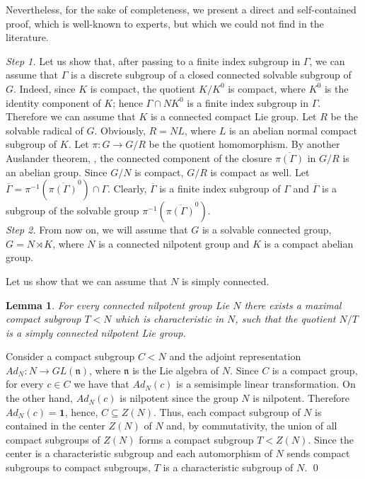 \documentclass[12pt]{article}
\theoremstyle{boldplain}
\newtheorem{lem}[equation]{Lemma}
\theoremstyle{bolddefinition}
\numberwithin{equation}{section}
\def\Ga{\Gamma}
\begin{document}
Nevertheless, for the sake of completeness, we present a direct and 
self-contained proof, which is well-known to  experts, but which we could not find in the literature. 

\medskip 
{\textit{Step 1.}} Let us show that, after passing to a finite index subgroup in $\Gamma$, 
we can assume that $\Gamma$ is a discrete subgroup of a closed connected solvable subgroup of $G$. 
Indeed, since $K$ is compact, the quotient $K/K^0$ is compact, where $K^0$ is the identity component of $K$;  hence $\Gamma \cap N K^0$ is a finite index subgroup in $\Gamma$. 
Therefore we can assume that $K$ is a connected compact Lie group. 
Let $R$ be the solvable radical of $G$. Obviously,
$R= N L$, where $L$ is an abelian normal compact subgroup of $K$. 
Let  $\pi : G \rightarrow G/R$ be the quotient homomorphism.  
By another Auslander theorem, \cite[Theorem 8.24]{R},  the connected component of the closure  
$\overline{\pi(\Gamma)}$ in  $G /R$ is an abelian group. 
Since $G/N$ is compact,  $G /R$ is compact as well.  
Let $\overline{\Gamma} = \pi^{-1} (\overline{\pi(\Gamma)}^0) \cap \Ga$. Clearly,  $\overline{\Gamma} $ is a finite index subgroup of $\Gamma$ and   $\overline{\Gamma} $ is a subgroup of the solvable group
 $\pi^{-1} (\overline{\pi(\Gamma)}^0)$. \\ 
 
 {\textit{Step 2.}} From now on, we will assume that $G$ is a solvable connected group, $G =N\rtimes K$, where $N$ is a connected nilpotent   group and $K$ is a compact abelian group.  
\par  Let us show that we can assume that $N$ is simply connected. 

\begin{lem}\label{lem:step1}
For every  connected nilpotent group Lie $N$ there exists a maximal compact subgroup $T< N$ which is characteristic in $N$, such that the quotient $N/T$ is a simply connected nilpotent Lie group.  
\end{lem} 
\proof Consider a  compact subgroup $C < N$ and  the adjoint representation $Ad_N: N \rightarrow GL({\mathfrak n})$, where ${\mathfrak n}$ is the Lie algebra of $N$. Since $C$ is a  compact group,  
for every $c\in C$ we have that $Ad_N (c)$ is a semisimple linear transformation. 
On the other hand,  $Ad_N (c)$ is nilpotent since the group $N$ is nilpotent. Therefore  $Ad_N (c) ={\mathbf 1}$, 
hence, $C \subseteq Z(N)$. Thus, each compact subgroup of $N$ is contained in the center $Z(N)$ of $N$ 
and, by commutativity, the union of all compact subgroups of $Z(N)$ forms a compact subgroup $T< Z(N)$. 
Since the center is a characteristic subgroup and each automorphism of $N$ sends compact subgroups to compact subgroups, $T$ is a characteristic subgroup of $N$.   
\qed  
 
\end{document}
